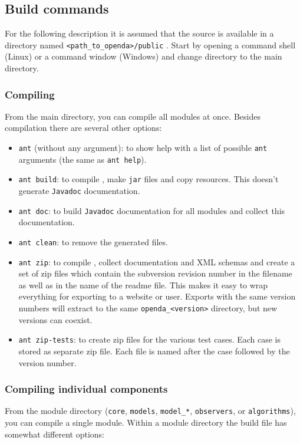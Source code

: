 \subsection{Build commands}
For the following description it is assumed that the \oda source is available in a directory named \verb|<path_to_openda>/public| .
Start by opening a command shell (Linux) or a command window (Windows) and change directory to the \oda main directory.

\subsubsection{Compiling \oda}
From the \oda main directory, you can compile all modules at once. Besides compilation there are several other options:
\begin{itemize}
\item \verb|ant| (without any argument): to show help with a list of possible \verb|ant| arguments (the same as \verb|ant help|).
\item \verb|ant build|: to compile \oda, make \verb|jar| files and copy resources. This doesn't generate \verb|Javadoc| documentation.
\item \verb|ant doc|: to build \verb|Javadoc| documentation for all modules and collect this documentation.
\item \verb|ant clean|: to remove the generated files.
\item \verb|ant zip|: to compile \oda, collect documentation and XML schemas and create a set of zip files which contain the subversion revision number in the filename as well as in the name of the readme file. This makes it easy to wrap everything for exporting to a website or user. Exports with the same version numbers will extract to the same \verb|openda_<version>| directory, but new versions can coexist.
\item \verb|ant zip-tests|: to create zip files for the various test cases. Each case is stored as separate zip file. Each file is named after the case followed by the version number.
\end{itemize}

\subsubsection{Compiling individual components}
From the module directory (\verb|core|, \verb|models|, \verb|model_*|, \verb|observers|, or \verb|algorithms|), you can compile a single module. Within a module directory the build file has somewhat different options:

